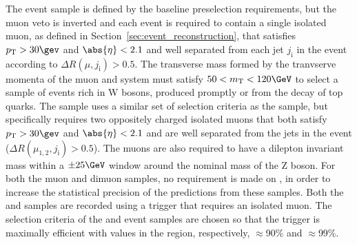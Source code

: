 The \mj event sample is defined by the baseline preselection
requirements, but the muon veto is inverted and each event is required
to contain a single isolated muon, as defined in
Section~\ref{sec:event_reconstruction}, that satisfies $\Pt > 30\gev$
and $\abs{\eta} < 2.1$ and well separated from each jet $j_{\text{i}}$
in the event according to $\Delta R(\mu,j_{\text{i}}) > 0.5$.
The transverse mass formed by the tranvserve momenta of the muon and
\ptvecmiss system must satisfy $50 < m_\text{T} < 120\GeV$ to select a
sample of events rich in W bosons, produced promptly or from the decay
of top quarks. The \mmj sample uses a similar set of selection
criteria as the \mj sample, but specifically requires two oppositely
charged isolated muons that both satisfy $\Pt > 30\gev$ and
$\abs{\eta} < 2.1$ and are well separated from the jets in the event
($\Delta R(\mu_{1,2},j_{\text{i}}) > 0.5$). The muons are also
required to have a dilepton invariant mass within a $\pm 25\GeV$
window around the nominal mass of the Z boson. For both the muon and
dimuon samples, no requirement is made on \alphat, in order to
increase the statistical precision of the predictions from these
samples. Both the \mj and \mmj samples are recorded using a trigger
that requires an isolated muon. The selection criteria of the \mj and
\mmj event samples are chosen so that the trigger is maximally
efficient with values in the region, respectively, $\approx$90\% and
$\approx$99\%.

